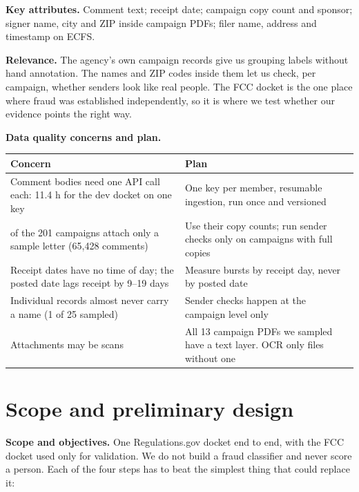 \documentclass[11pt]{article}
\begin{document}
\textbf{Key attributes.} Comment text; receipt date; campaign copy count and sponsor; signer name,
city and ZIP inside campaign PDFs; filer name, address and timestamp on ECFS.

\textbf{Relevance.} The agency's own campaign records give us grouping labels without hand
annotation. The names and ZIP codes inside them let us check, per campaign, whether senders look like
real people. The FCC docket is the one place where fraud was established independently, so it is
where we test whether our evidence points the right way.

\textbf{Data quality concerns and plan.}

\begin{center}
\small
\renewcommand{\arraystretch}{1.2}
\begin{tabular}{@{}L{0.43\textwidth}L{0.50\textwidth}@{}}
\toprule
\textbf{Concern} & \textbf{Plan} \\
\midrule
Comment bodies need one API call each: 11.4 h for the dev docket on one key & One key per member,
resumable ingestion, run once and versioned \\
 of the 201 campaigns attach only a sample letter (65{,}428 comments) & Use their copy counts;
run sender checks only on campaigns with full copies \\
\addlinespace[2pt]
Receipt dates have no time of day; the posted date lags receipt by 9--19 days & Measure bursts by
receipt day, never by posted date \\
\addlinespace[2pt]
Individual records almost never carry a name (1 of 25 sampled) & Sender checks happen at the
campaign level only \\
\addlinespace[2pt]
Attachments may be scans & All 13 campaign PDFs we sampled have a text layer. OCR only files without
one \\
\bottomrule
\end{tabular}
\end{center}

\section{Scope and preliminary design}

\textbf{Scope and objectives.} One Regulations.gov docket end to end, with the FCC docket used only
for validation. We do not build a fraud classifier and never score a person. Each of the four steps
has to beat the simplest thing that could replace it:
\end{document}

